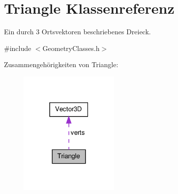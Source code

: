 \hypertarget{classTriangle}{\section{Triangle Klassenreferenz}
\label{classTriangle}
}


Ein durch 3 Ortsvektoren beschriebenes Dreieck.  




{\ttfamily \#include $<$Geometry\-Classes.\-h$>$}



Zusammengehörigkeiten von Triangle\-:\nopagebreak
\begin{figure}[H]
\begin{center}
\leavevmode
\includegraphics[width=138pt]{classTriangle__coll__graph}
\end{center}
\end{figure}

